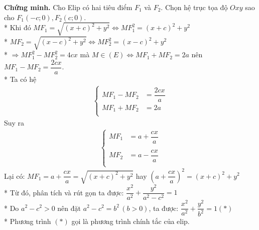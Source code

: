 \textbf{Chứng minh.}
Cho Elip có hai tiêu điểm $F_{1}$ và $F_{2}$. Chọn hệ trục tọa độ $Oxy$ sao cho $F_{1}(-c;0), F_{2}(c;0)$.\\*
Khi đó
$MF_{1}=\sqrt{(x+c)^{2}+y^{2}}\Leftrightarrow MF_{1}^{2}=(x+c)^{2}+y^{2}$\\*
$MF_{2}=\sqrt{(x-c)^{2}+y^{2}}\Leftrightarrow MF_{2}^{2}=(x-c)^{2}+y^{2}$\\*
$\Rightarrow MF_{1}^{2}-MF_{2}^{2}=4cx$ mà $M\in (E) \Leftrightarrow MF_{1}+MF_{2}=2a$ nên $MF_{1}-MF_{2}=\dfrac{2cx}{a}$.\\*
Ta có hệ
\begin{align}
\begin{cases}
MF_{1}-MF_{2} &=\dfrac{2cx}{a}\\
MF_{1}+MF_{2} &=2a \\
\end{cases}
\end{align}
Suy ra 
\begin{align}
\begin{cases}
MF_{1} &=a+\dfrac{cx}{a}\\&\\
MF_{2} &=a-\dfrac{cx}{a} \\
\end{cases}
\end{align}
Lại có: $MF_{1}=a+\dfrac{cx}{a}=\sqrt{(x+c)^{2}+y^{2}}$ hay $\left(a+\dfrac{cx}{a}\right)^{2}=(x+c)^{2}+y^{2}$\\*
Từ đó, phân tích và rút gọn ta được: $\dfrac{x^{2}}{a^2}+\dfrac{y^{2}}{a^{2}-c^{2}}=1$\\*
Do $a^{2}-c^{2}>0$ nên đặt $a^{2}-c^{2}=b^{2} \,(b>0)$, ta được:  $\boxed{\dfrac{x^{2}}{a^{2}}+\dfrac{y^{2}}{b^{2}}=1
	(*)}$\\*
Phương trình $(*)$ gọi là phương trình chính tắc của elip.
